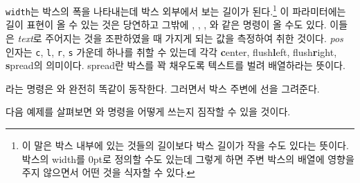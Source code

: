 \noindent \texttt{width}는 박스의 폭을 나타내는데 박스 외부에서 보는 길이가 된다.\footnote{이 말은 박스 내부에 있는 것들의 길이보다 박스 길이가 작을 수도 있다는 뜻이다. 박스의 width를 0pt로 정의할 수도 있는데 그렇게 하면 주변 박스의 배열에 영향을 주지 않으면서 어떤 것을 식자할 수 있다.}
이 파라미터에는 길이 표현이 올 수 있는 것은 당연하고 그밖에 , , , 와 같은 명령이 올 수도 있다. 이들은 \emph{text}로 주어지는 것을 조판하였을 때 가지게 되는 값을 측정하여 취한 것이다.
\emph{pos} 인자는 \texttt{c}, \texttt{l}, \texttt{r}, \texttt{s} 가운데  하나를 취할 수 있는데 각각 \textbf{c}enter, flush\textbf{l}eft, flush\textbf{r}ight, \textbf{s}pread의 의미이다. spread란 박스를 꽉 채우도록 텍스트를 벌려 배열하라는 뜻이다.%

라는 명령은 와 완전히 똑같이 동작한다. 그러면서 박스 주변에 선을 그려준다.

다음 예제를 살펴보면 와  명령을 어떻게 쓰는지 짐작할 수 있을 것이다.%


